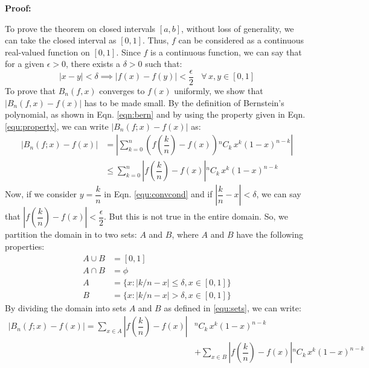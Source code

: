 \documentclass[
]{book}
\begin{document}
\textbf{Proof:}

To prove the theorem on closed intervals \([a,b]\), without loss of generality, we can take the closed interval as \([0, 1]\). Thus, \(f\) can be considered as a continuous real-valued function on \([0, 1]\). Since \(f\) is a continuous function, we can say that for a given \(\epsilon > 0\), there exists a \(\delta > 0\) such that:
\begin{equation}
    |x-y| < \delta \implies |f(x) - f(y)| <\frac{\epsilon}{2} \ \ \ \  \forall \, x,y \in [0,1]
    \label{equ:convcond}
\end{equation}
To prove that \(B_n(f,x)\) converges to \(f(x)\) uniformly, we show that \(|B_n(f,x) - f(x)|\) has to be made small. By the definition of Bernstein's polynomial, as shown in Eqn. \ref{eqn:bern} and by using the property given in Eqn. \ref{equ:property}, we can write \(|B_n(f;x) - f(x)|\) as:
\begin{align*}
    |B_n(f;x) - f(x)| &= \left| \sum_{k=0}^n {\left(f\left(\dfrac{k}{n}\right) - f(x)\right) {}^nC_{k} \, x^k (1-x)^{n-k}} \right| \\
    &\leq \sum_{k=0}^n {\left|f\left(\dfrac{k}{n}\right) - f(x)\right| {}^nC_{k} \, x^k (1-x)^{n-k}}
\end{align*}
Now, if we consider \(y=\dfrac{k}{n}\) in Eqn. \ref{equ:convcond} and if \(\left|\dfrac{k}{n} - x\right| < \delta\), we can say that \(\left|f\left(\dfrac{k}{n}\right) - f(x)\right| < \dfrac{\epsilon}{2}\). But this is not true in the entire domain. So, we partition the domain in to two sets: \(A\) and \(B\), where \(A\) and \(B\) have the following properties:
\begin{equation}
    \begin{aligned}
        A \cup B &= [0,1]\\
        A \cap B &= \phi\\
        A &= \{x:|k/n - x| \leq \delta, x \in [0,1]\}\\
        B &= \{x:|k/n-x| > \delta, x \in [0,1]\}
    \end{aligned}
    \label{equ:sets}
\end{equation}
By dividing the domain into sets \(A\) and \(B\) as defined in \ref{equ:sets}, we can write:
\begin{equation*}
\begin{split}
    |B_n(f;x) - f(x)| = \sum_{x\in A} \left|f\left(\dfrac{k}{n}\right) - f(x)\right| &{}^nC_{k}\, x^k (1-x)^{n-k} \\
    &+ \sum_{x\in B} \left|f\left(\dfrac{k}{n}\right) - f(x)\right |{}^nC_{k}\, x^k (1-x)^{n-k}
\end{split}
\end{equation*}
\end{document}
